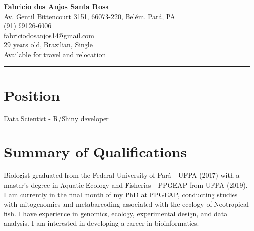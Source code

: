 \documentclass[a4paper,10pt]{article}
\begin{document}
\begin{center}
	\textbf{\huge Fabricio dos Anjos Santa Rosa}\\
	\vspace{2mm}
	Av. Gentil Bittencourt 3151, 66073-220, Belém, Pará, PA\\
	(91) 99126-6006\\
	\href{mailto:fabriciodosanjos14@gmail.com}{fabriciodosanjos14@gmail.com}\\
	29 years old, Brazilian, Single\\
	Available for travel and relocation
\end{center}

\noindent\rule{\linewidth}{0.8pt}

\section*{Position}
Data Scientist - R/Shiny developer

\section*{Summary of Qualifications}
Biologist graduated from the Federal University of Pará - UFPA (2017) with a master's degree in Aquatic Ecology and Fisheries - PPGEAP from UFPA (2019). I am currently in the final month of my PhD at PPGEAP, conducting studies with mitogenomics and metabarcoding associated with the ecology of Neotropical fish. I have experience in genomics, ecology, experimental design, and data analysis. I am interested in developing a career in bioinformatics.
\end{document}
